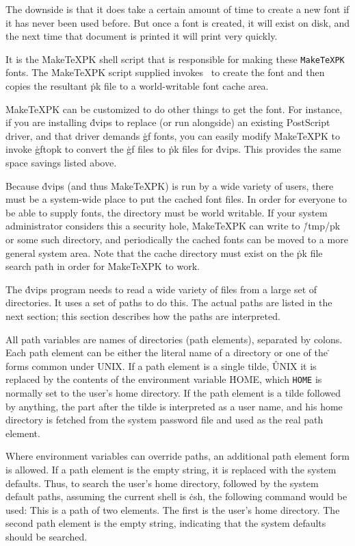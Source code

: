 The downside is that it does take a certain amount of time to create a new
font if it has never been used before.  But once a font is created, it
will exist on disk, and the next time that document is printed it will print
very quickly.

It is the \.{MakeTeXPK} shell script that is responsible for making these
\^{{\tt MakeTeXPK}}
fonts.  The \.{MakeTeXPK} script supplied invokes \MF\ to create the font and
then copies the resultant \.{pk} file to a world-writable font cache area.

\.{MakeTeXPK} can be customized to do other things to get the font.  For
instance, if you are installing \.{dvips} to replace (or run alongside)
an existing PostScript driver, and that driver demands \.{gf} fonts, you
can easily modify \.{MakeTeXPK} to invoke \.{gftopk} to convert the
\.{gf} files to \.{pk} files for \.{dvips}.  This provides the same space
savings listed above.

Because \.{dvips} (and thus \.{MakeTeXPK}) is run by a wide variety of users,
there must be a system-wide place to put the cached font files.  In order
for everyone to be able to supply fonts, the directory must be world
writable.  If your system administrator considers this a security hole,
\.{MakeTeXPK} can write to \.{/tmp/pk} or some such directory, and
periodically the cached fonts can be moved to a more general system area.
Note that the cache directory must exist on the \.{pk} file search path
in order for \.{MakeTeXPK} to work.


The \.{dvips} program needs to read a wide variety of files from a large
set of directories.  It uses a set of paths to do this.  The actual
paths are listed in the next section; this section describes how the
paths are interpreted.

All path variables are names of directories (path elements),
separated by colons.
Each path element can be either the literal name of a directory or one
of the \.{\tilde} forms common under UNIX.  If a path element is a single tilde,
\^{UNIX}
it is replaced by the contents of the environment variable \.{HOME}, which
\^{{\tt HOME}}
is normally set to the user's home directory.  If the path element is
a tilde followed by anything, the part after the tilde is interpreted as
a user name, and his home directory is fetched from the system password
file and used as the real path element.

Where environment variables can override paths, an additional path
element form is allowed.  If a path element is the empty string, it
is replaced with the system defaults.  Thus, to
search the user's home directory, followed by the system
default paths, assuming the current shell is \.{csh},
the following command would be used:
\noindent
This is a path of two elements.  The first is the user's home directory.
The second path element is the empty string, indicating that
the system defaults should be searched.

